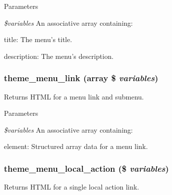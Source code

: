 \begin{DoxyParams}{Parameters}
\item[{\em \$variables}]An associative array containing:
\begin{DoxyItemize}
\item title: The menu's title.
\item description: The menu's description. 
\end{DoxyItemize}\end{DoxyParams}
\hypertarget{group__themeable_ga60ee17f550a787c90d1452f6bbe98a56}{
\subsubsection[{theme\_\-menu\_\-link}]{\setlength{\rightskip}{0pt plus 5cm}theme\_\-menu\_\-link (array \$ {\em variables})}}
\label{group__themeable_ga60ee17f550a787c90d1452f6bbe98a56}
Returns HTML for a menu link and submenu.


\begin{DoxyParams}{Parameters}
\item[{\em \$variables}]An associative array containing:
\begin{DoxyItemize}
\item element: Structured array data for a menu link. 
\end{DoxyItemize}\end{DoxyParams}
\hypertarget{group__themeable_ga192701ba5ebb20f4d315f84baaf6689e}{
\subsubsection[{theme\_\-menu\_\-local\_\-action}]{\setlength{\rightskip}{0pt plus 5cm}theme\_\-menu\_\-local\_\-action (\$ {\em variables})}}
\label{group__themeable_ga192701ba5ebb20f4d315f84baaf6689e}
Returns HTML for a single local action link.


